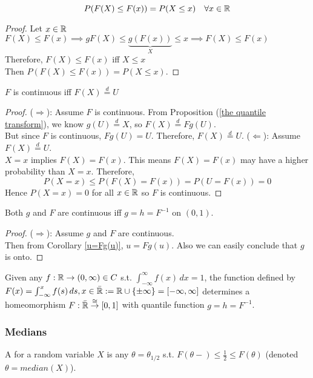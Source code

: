 \documentclass[11pt]{article}
\numberwithin{equation}{section}
\begin{document}
\corollary
\begin{equation}
	P(F(X) \leq F(x)) = P(X \leq x) \quad \forall x \in \mathbb{R}
\end{equation}

\begin{proof}
	Let $x \in \mathbb{R}$\\
	$F(X) \leq F(x) \implies gF(X) \leq \underbrace{g(F(x))}_{X} \leq x \implies F(X) \leq F(x)$ \\
	Therefore, $F(X) \leq F(x)$ iff $X \leq x$\\
	Then $P(F(X) \leq F(x)) = P(X \leq x)$.
\end{proof}

$F$ is continuous iff $F(X) \overset{d}{=} U$
\begin{proof}
	($\Rightarrow$): Assume $F$ is continuous. From Proposition (\ref{the quantile transform}), we know $g(U) \overset{d}{=}X$, so $F(X) \overset{d}{=} Fg(U)$. \\
	 But since $F$ is continuous, $Fg(U) = U$. Therefore, $F(X) \overset{d}{=} U$.
	($\Leftarrow$): Assume $F(X) \overset{d}{=} U$. \\
	$X = x$ implies $F(X) = F(x)$. This means $F(X) = F(x)$ may have a higher probability than $X=x$. Therefore,
	$$P(X=x) \leq P(F(X) = F(x)) = P(U = F(x)) = 0$$
	Hence $P(X = x) = 0$ for all $x \in \mathbb{R}$ so $F$ is continuous.
\end{proof}

\proposition
Both $g$ and $F$ are continuous iff $g = h = F^{-1}$ on $(0, 1)$.
\begin{proof}
	($\Rightarrow$): Assume $g$ and $F$ are continuous. \\
	Then from Corollary \ref{u=Fg(u)}, $u = Fg(u)$. Also we can easily conclude that $g$ is onto. 
\end{proof}
 
\property
Given any $f: \mathbb{R} \rightarrow (0, \infty) \in C$ s.t. $\int_{-\infty}^\infty f(x)\,dx =1$, the function defined by $F(x) = \int_{-\infty}^x f(s)\,ds, x \in \bar{\mathbb{R}} := \mathbb{R} \cup \{\pm \infty\} = [-\infty, \infty]$ determines a homeomorphism $F: \bar{\mathbb{R}} \overset{\cong}{\rightarrow} [0, 1]$ with quantile function $g = h = F^{-1}$.

\subsubsection{Medians}
 A  for a random variable $X$ is any $\theta = \theta_{1/2}$ s.t. $F(\theta-) \leq \frac{1}{2} \leq F(\theta)$ (denoted $\theta = median(X)$).
\end{document}
